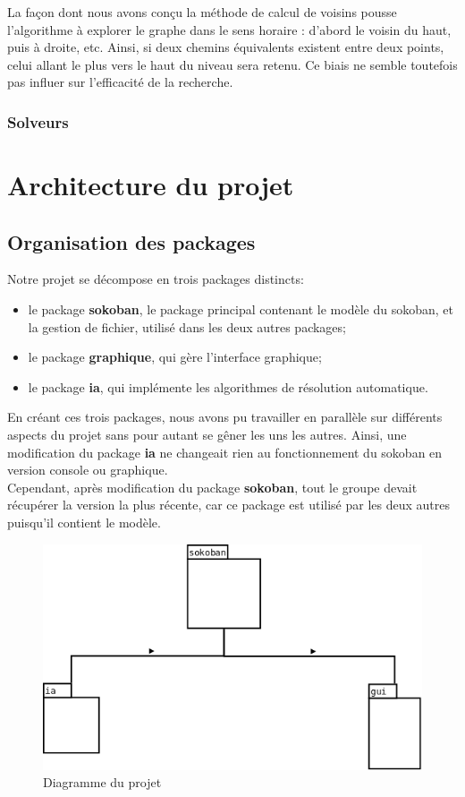 \documentclass[a4paper,12pt]{article} %
\begin{document}
La façon dont nous avons conçu la méthode de calcul de voisins pousse l'algorithme à explorer le graphe dans le sens horaire : d'abord le voisin du haut, puis à droite, etc. Ainsi, si deux chemins équivalents existent entre deux points, celui allant le plus vers le haut du niveau sera retenu. Ce biais ne semble toutefois pas influer sur l'efficacité de la recherche.

\subsubsection{Solveurs}

\section{Architecture du projet}

\subsection{Organisation des packages}

Notre projet se décompose en trois packages distincts:
\begin{itemize}
\item le package \textbf{sokoban}, le package principal contenant le modèle du sokoban, et la gestion de fichier, utilisé dans les deux autres packages;
\item le package \textbf{graphique}, qui gère l'interface graphique;
\item le package \textbf{ia}, qui implémente les algorithmes de résolution automatique.
\end{itemize}

En créant ces trois packages, nous avons pu travailler en parallèle sur différents aspects du projet sans pour autant se gêner les uns les autres.
Ainsi, une modification du package \textbf{ia} ne changeait rien au fonctionnement du sokoban en version console ou graphique.\\
Cependant, après modification du package \textbf{sokoban}, tout le groupe devait récupérer la version la plus récente, car ce package est utilisé par les deux autres puisqu'il contient le modèle.

\begin{figure}[!h]
\centering
\includegraphics[scale=0.3]{images/packages.png}
\caption{Diagramme du projet}
\end{figure}
\end{document}
